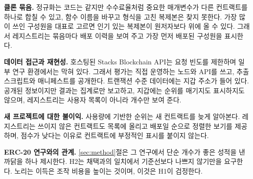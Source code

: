 \textbf{클론 묶음.} 정규화는 코드는 같지만 수수료율처럼 중요한 매개변수가 다른 컨트랙트를 하나로 합칠 수 있고, 함수 이름을 바꾸고 형식을 고친 복제본은 찾지 못한다. 가장 많이 쓰인 구성원을 대표로 고르면 인기 있는 복제본이 원저자보다 위에 올 수 있다. 그래서 레지스트리는 묶음마다 배포 이력을 보여 주고 가장 먼저 배포된 구성원을 표시한다.

\textbf{데이터 접근과 재현성.} 호스팅된 Stacks Blockchain API는 요청 빈도를 제한하며 일부 연구 환경에서는 막혀 있다. 그래서 평가는 직접 운영하는 노드와 API를 쓰고, 추출 스크립트와 매니페스트를 공개한다. 트랜잭션 수준 데이터에는 지갑 주소가 들어 있다. 공개된 정보이지만 결과는 집계로만 보고하고, 지갑에는 순위를 매기지도 표시하지도 않으며, 레지스트리는 사용자 목록이 아니라 개수만 보여 준다.

\textbf{새 프로젝트에 대한 불이익.} 사용량에 기반한 순위는 새 컨트랙트를 늦게 알아본다. 레지스트리는 쓰이지 않은 컨트랙트도 목록에 올리고 배포일 순으로 정렬한 보기를 제공하며, 점수가 낮다는 이유로 컨트랙트에 부정적인 표시를 붙이지 않는다.

\textbf{ERC-20 연구와의 관계.} \ref{sec:method}절은 그 연구에서 단순 개수가 좋은 성적을 낸 까닭을 하나 제시한다. H2는  채택과의 일치에서 기준선보다 나쁘지 않기만을 요구한다.  노리는 이득은 조작 비용을 높이는 것이며, 이것은 H1이 검정한다.
